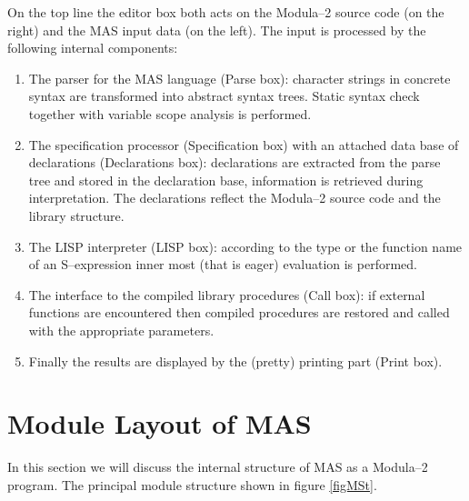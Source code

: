 On the top line the editor box both acts on the 
Modula--2 source code (on the right) 
and the MAS input data (on the left). 
The input is processed by the following internal components: 
\begin{enumerate}
\item The parser for the MAS language (Parse box):
      character strings in concrete syntax are transformed 
      into abstract syntax trees. Static syntax check together 
      with variable scope analysis is performed.
\item The specification processor (Specification box) 
      with an attached data base of declarations 
      (Declarations box): 
      declarations are extracted from the parse tree and 
      stored in the declaration base, 
      information is retrieved during interpretation.
      The declarations reflect the Modula--2 source code 
      and the library structure.
\item The LISP interpreter (LISP box): 
      according to the type or the function name of an
      S--expression inner most (that is eager) evaluation 
      is performed. 
\item The interface to the compiled library procedures (Call box): 
      if external functions are encountered 
      then compiled procedures are restored and 
      called with the appropriate parameters. 
\item Finally the results are displayed by the 
      (pretty) printing part (Print box).  
\end{enumerate}


\section{Module Layout of MAS}

In this section we will discuss the
internal structure of MAS as a Modula--2 program.
The principal module structure shown in figure \ref{figMSt}.

